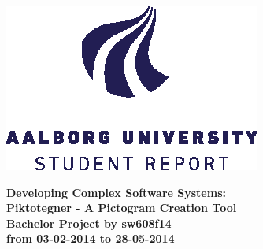 \thispagestyle{empty} %
\begin{center}
	\includegraphics[scale=1]{media/aau-logo-vector}\\
	\vspace{0.25cm}
\end{center} 

\vspace{1cm}
\begin{center}
\textbf{\huge {Developing Complex Software Systems:}} \\ \vspace{0.5cm}
\textbf{\Large {Piktotegner - A Pictogram Creation Tool}} \\ \vspace{1cm}
\textbf{\large Bachelor Project by sw608f14}\\ \vspace{0.5cm}
\textbf{\normalsize from 03-02-2014 to 28-05-2014}\\
\end{center}

\vspace{0.25cm}


\thispagestyle{empty}

\newpage
\thispagestyle{empty}
\mbox{}


